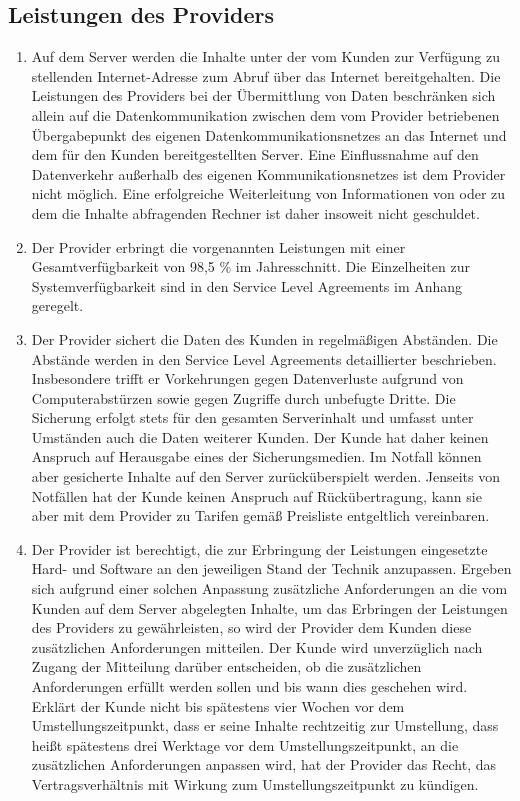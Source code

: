 \documentclass{terms}
\begin{document}
\subsection{Leistungen des Providers}
\begin{enumerate}
\item Auf dem Server werden die Inhalte unter der vom Kunden zur Verfügung zu stellenden Internet-Adresse zum Abruf über das Internet bereitgehalten. Die Leistungen des Providers bei der Übermittlung von Daten beschränken sich allein auf die Datenkommunikation zwischen dem vom Provider betriebenen Übergabepunkt des eigenen Datenkommunikationsnetzes an das Internet und dem für den Kunden bereitgestellten Server. Eine Einflussnahme auf den Datenverkehr außerhalb des eigenen Kommunikationsnetzes ist dem Provider nicht möglich. Eine erfolgreiche Weiterleitung von Informationen von oder zu dem die Inhalte abfragenden Rechner ist daher insoweit nicht geschuldet.
\item Der Provider erbringt die vorgenannten Leistungen mit einer Gesamtverfügbarkeit von 98,5 \% im Jahresschnitt. Die Einzelheiten zur Systemverfügbarkeit sind in den Service Level Agreements im Anhang geregelt. 
\item Der Provider sichert die Daten des Kunden in regelmäßigen Abständen. Die Abstände werden in den Service Level Agreements detaillierter beschrieben. Insbesondere trifft er Vorkehrungen gegen Datenverluste aufgrund von Computerabstürzen sowie gegen Zugriffe durch unbefugte Dritte. Die Sicherung erfolgt stets für den gesamten Serverinhalt und umfasst unter Umständen auch die Daten weiterer Kunden. Der Kunde hat daher keinen Anspruch auf Herausgabe eines der Sicherungsmedien. Im Notfall können aber gesicherte Inhalte auf den Server zurücküberspielt werden. Jenseits von Notfällen hat der Kunde keinen Anspruch auf Rückübertragung, kann sie aber mit dem Provider zu Tarifen gemäß Preisliste entgeltlich vereinbaren.
\item Der Provider ist berechtigt, die zur Erbringung der Leistungen eingesetzte Hard- und Software an den jeweiligen Stand der Technik anzupassen. Ergeben sich aufgrund einer solchen Anpassung zusätzliche Anforderungen an die vom Kunden auf dem Server abgelegten Inhalte, um das Erbringen der Leistungen des Providers zu gewährleisten, so wird der Provider dem Kunden diese zusätzlichen Anforderungen mitteilen. Der Kunde wird unverzüglich nach Zugang der Mitteilung darüber entscheiden, ob die zusätzlichen Anforderungen erfüllt werden sollen und bis wann dies geschehen wird. Erklärt der Kunde nicht bis spätestens vier Wochen vor dem Umstellungszeitpunkt, dass er seine Inhalte rechtzeitig zur Umstellung, dass heißt spätestens drei Werktage vor dem Umstellungszeitpunkt, an die zusätzlichen Anforderungen anpassen wird, hat der Provider das Recht, das Vertragsverhältnis mit Wirkung zum Umstellungszeitpunkt zu kündigen.
\end{enumerate}
\end{document}
